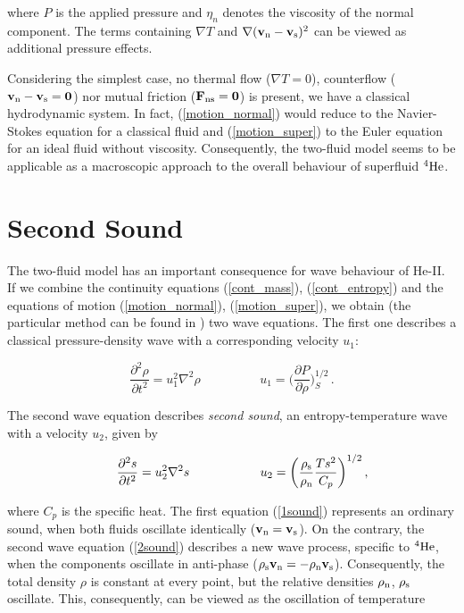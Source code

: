 where $P$ is the applied pressure and $\eta_n$ denotes the viscosity of the normal component. The terms containing $\nabla T$ and $\nabla (\mathbf{v_{\mathrm{n}}} - \mathbf{v_{\mathrm{s}}})^2$ can be viewed as additional pressure effects.

Considering the simplest case, no thermal flow ($\nabla T = 0$), counterflow ($\mathbf{v_{\mathrm{n}}} - \mathbf{v_{\mathrm{s}}} = \mathbf{0}$) nor mutual friction ($\mathbf{F_{\mathrm{ns}}} = \mathbf{0}$) is present, we have a classical hydrodynamic system. In fact, (\ref{motion_normal}) would reduce to the Navier-Stokes equation for a classical fluid and (\ref{motion_super}) to the Euler equation for an ideal fluid without viscosity. Consequently, the two-fluid model seems to be applicable as a macroscopic approach to the overall behaviour of superfluid ${}^4\mathrm{He}$.  

\section{Second Sound}

The two-fluid model has an important consequence for wave behaviour of He-II. If we combine the continuity equations (\ref{cont_mass}), (\ref{cont_entropy}) and the equations of motion (\ref{motion_normal}), (\ref{motion_super}), we obtain (the particular method can be found in \cite{varga}) two wave equations. The first one describes a classical pressure-density wave with a corresponding velocity $ u_1 $:

\begin{equation}
\frac{\partial^2 \rho}{\partial t^2} = u_1^2 \nabla^2 \rho
\hspace{2cm}
u_1 = \bigg( \frac{\partial P}{\partial \rho} \bigg)_S^{1/2}\,.
\label{1sound}
\end{equation}

The second wave equation describes \textit{second sound}, an entropy-temperature wave with a velocity $ u_2 $,  given by

\begin{equation}
\hspace{0.6cm}
\frac{\partial^2 s}{\partial t^2} = u_2^2 \nabla^2 s
\hspace{2cm}
u_2 = \bigg( \frac{\rho_{\mathrm{s}}}{\rho_{\mathrm{n}}} \frac{Ts^2}{C_p} \bigg )^{1/2}\,,
\label{2sound}
\end{equation}

where $C_p$ is the specific heat. The first equation (\ref{1sound}) represents an ordinary sound, when both fluids oscillate identically ($\mathbf{v_{\mathrm{n}}} = \mathbf{v_{\mathrm{s}}}$). On the contrary, the second wave equation (\ref{2sound}) describes a new wave process, specific to $ {}^4\mathrm{He} $, when the components oscillate in anti-phase ($\rho_{\mathrm{s}}\mathbf{v_{\mathrm{n}}} = -\rho_{\mathrm{n}}\mathbf{v_{\mathrm{s}}}$). Consequently, the total density $ \rho $ is constant at every point, but the relative densities $ \rho_{\mathrm{n}} $, $ \rho_{\mathrm{s}} $ oscillate. This, consequently, can be viewed as the oscillation of temperature

